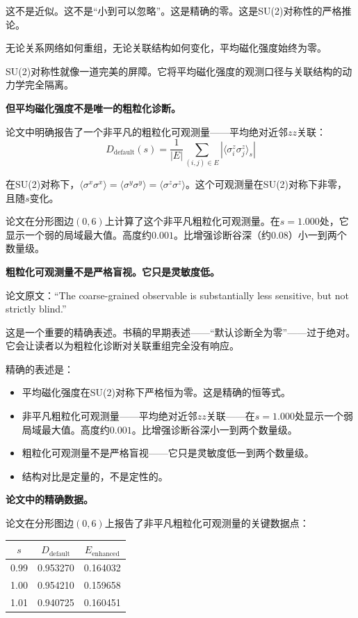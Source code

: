 \documentclass[11pt,a4paper]{book}
\theoremstyle{definition}
\begin{document}
这不是近似。这不是“小到可以忽略”。这是精确的零。这是SU(2)对称性的严格推论。

无论关系网络如何重组，无论关联结构如何变化，平均磁化强度始终为零。

SU(2)对称性就像一道完美的屏障。它将平均磁化强度的观测口径与关联结构的动力学完全隔离。

\textbf{但平均磁化强度不是唯一的粗粒化诊断。}

论文中明确报告了一个非平凡的粗粒化可观测量——平均绝对近邻$zz$关联：
\begin{equation}
D_{\text{default}}(s) = \frac{1}{|E|} \sum_{(i,j) \in E} \left| \langle \sigma_i^z \sigma_j^z \rangle_s \right|
\end{equation}

在SU(2)对称下，$\langle\sigma^x\sigma^x\rangle = \langle\sigma^y\sigma^y\rangle = \langle\sigma^z\sigma^z\rangle$。这个可观测量在SU(2)对称下非零，且随$s$变化。

论文在分形图边$(0,6)$上计算了这个非平凡粗粒化可观测量。在$s=1.000$处，它显示一个弱的局域最大值。高度约$0.001$。比增强诊断谷深（约$0.08$）小一到两个数量级。

\textbf{粗粒化可观测量不是严格盲视。它只是灵敏度低。}

论文原文：“The coarse-grained observable is substantially less sensitive, but not strictly blind.”

这是一个重要的精确表述。书稿的早期表述——“默认诊断全为零”——过于绝对。它会让读者以为粗粒化诊断对关联重组完全没有响应。

精确的表述是：

\begin{itemize}
\item 平均磁化强度在SU(2)对称下严格恒为零。这是精确的恒等式。
\item 非平凡粗粒化可观测量——平均绝对近邻$zz$关联——在$s=1.000$处显示一个弱局域最大值。高度约$0.001$。比增强诊断谷深小一到两个数量级。
\item 粗粒化可观测量不是严格盲视——它只是灵敏度低一到两个数量级。
\item 结构对比是定量的，不是定性的。
\end{itemize}

\textbf{论文中的精确数据。}

论文在分形图边$(0,6)$上报告了非平凡粗粒化可观测量的关键数据点：

\begin{table}[h]
\centering
\begin{tabular}{ccc}
\toprule
$s$ & $D_{\text{default}}$ & $E_{\text{enhanced}}$ \\
\midrule
0.99 & 0.953270 & 0.164032 \\
1.00 & 0.954210 & 0.159658 \\
1.01 & 0.940725 & 0.160451 \\
\bottomrule
\end{tabular}
\end{table}
\end{document}
